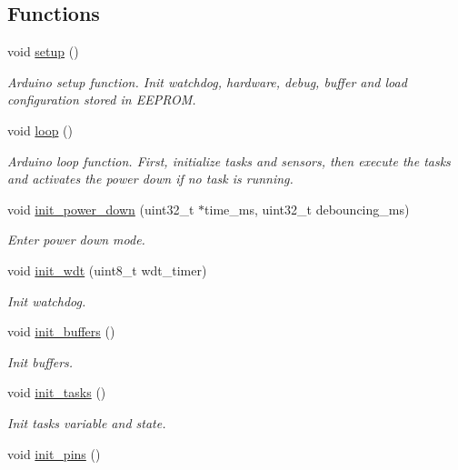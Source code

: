 \subsection*{Functions}
\begin{DoxyCompactItemize}
\item 
void \hyperlink{i2c-th_8ino_a4fc01d736fe50cf5b977f755b675f11d}{setup} ()
\begin{DoxyCompactList}\small\item\em Arduino setup function. Init watchdog, hardware, debug, buffer and load configuration stored in E\+E\+P\+R\+OM. \end{DoxyCompactList}\item 
void \hyperlink{i2c-th_8ino_afe461d27b9c48d5921c00d521181f12f}{loop} ()
\begin{DoxyCompactList}\small\item\em Arduino loop function. First, initialize tasks and sensors, then execute the tasks and activates the power down if no task is running. \end{DoxyCompactList}\item 
void \hyperlink{i2c-th_8ino_afb98a0f07c30784284f48271ffe02b97}{init\+\_\+power\+\_\+down} (uint32\+\_\+t $\ast$time\+\_\+ms, uint32\+\_\+t debouncing\+\_\+ms)
\begin{DoxyCompactList}\small\item\em Enter power down mode. \end{DoxyCompactList}\item 
void \hyperlink{i2c-th_8ino_a980e73df66b14b1190bc25da430a4f12}{init\+\_\+wdt} (uint8\+\_\+t wdt\+\_\+timer)
\begin{DoxyCompactList}\small\item\em Init watchdog. \end{DoxyCompactList}\item 
void \hyperlink{i2c-th_8ino_ad241cc00b1a92e6d85827df96778e442}{init\+\_\+buffers} ()
\begin{DoxyCompactList}\small\item\em Init buffers. \end{DoxyCompactList}\item 
void \hyperlink{i2c-th_8ino_ab4bf0a3d77da083f131d3fa35a37d2b1}{init\+\_\+tasks} ()
\begin{DoxyCompactList}\small\item\em Init tasks variable and state. \end{DoxyCompactList}\item 
void \hyperlink{i2c-th_8ino_ad8b80a0c08f928106018edd6ea435b95}{init\+\_\+pins} ()

\end{DoxyCompactItemize}
